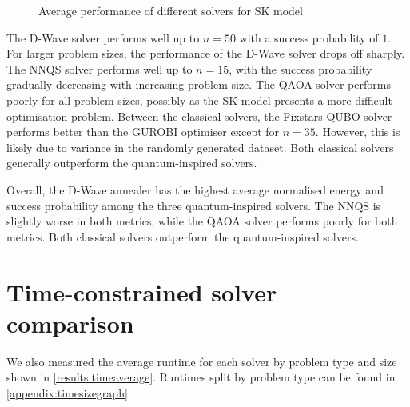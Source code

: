 \begin{figure}[!htb]
    \centering
    \hspace{30pt}
    \caption{Average performance of different solvers for SK model}
    \label{all-skmodel-average}
\end{figure}

The D-Wave solver performs well up to $n=50$ with a success probability of $1$. For larger problem sizes, the performance of the D-Wave solver drops off sharply. The NNQS solver performs well up to $n=15$, with the success probability gradually decreasing with increasing problem size. The QAOA solver performs poorly for all problem sizes, possibly as the SK model presents a more difficult optimisation problem. Between the classical solvers, the Fixstars QUBO solver performs better than the GUROBI optimiser except for $n=35$. However, this is likely due to variance in the randomly generated dataset. Both classical solvers generally outperform the quantum-inspired solvers.

Overall, the D-Wave annealer has the highest average normalised energy and success probability among the three quantum-inspired solvers. The NNQS is slightly worse in both metrics, while the QAOA solver performs poorly for both metrics. Both classical solvers outperform the quantum-inspired solvers.

\section{Time-constrained solver comparison}
We also measured the average runtime for each solver by problem type and size shown in \autoref{results:timeaverage}. Runtimes split by problem type can be found in \autoref{appendix:timesizegraph}

